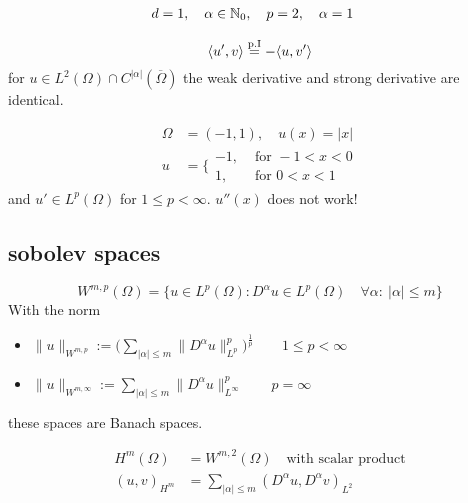 \begin{example}
	\begin{align*}
	d&= 1, \quad \alpha \in \mathbb{N}_0, \quad p=2, \quad \alpha=1
	\end{align*}
	
	\begin{equation*}
	\langle u',v \rangle\overset{\text{p.I} }{=} -\langle u,v'\rangle\\
	\end{equation*}
	for $u \in L^2(\Omega)\cap C^{|\alpha|}( \overline{\Omega} )$ the weak derivative and strong derivative are identical.
\end{example}

\begin{example}

\begin{align*}
	\Omega &= (-1,1),\quad u(x) = |x|\\
	u&=  \Bigg\{
	\begin{array}{cl}
		-1 ,  &\text{ for } -1 < x < 0\\
		1 ,  &\text{ for } 0 < x <1 
	\end{array}
\end{align*}
and $u' \in L^p(\Omega)$ for $1 \leq p < \infty$. $u''(x)$ does not work!\enter
\end{example}

\subsection{sobolev spaces}

\begin{equation*}
	W^{m,p}(\Omega) = \big\{ u\in L^p(\Omega) : D^\alpha u \in L^p(\Omega) \quad \forall \alpha:\ |\alpha|\leq m \big\}
\end{equation*}
With the norm

\begin{itemize}
	\item $\| u\|_{W^{m,p}} := \Big ( \displaystyle\sum_{|\alpha|\leq m}  \| D^\alpha u \|^p_{L^p}  \Big )^{\frac{1}{p}} \qquad 1\leq p < \infty$
	\item  $\| u\|_{W^{m,\infty}} :=  \displaystyle\sum_{|\alpha|\leq m}  \| D^\alpha u \|^p_{L^\infty}   \qquad  p = \infty$
\end{itemize}

these spaces are Banach spaces.


\begin{align*}
	H^m(\Omega) &= W^{m,2}(\Omega) \quad \text{with scalar product}\\
	(u,v)_{H^m} &= \displaystyle \sum_{|\alpha| \leq m} (D^\alpha u, D^\alpha v)_{L^2}
\end{align*}

